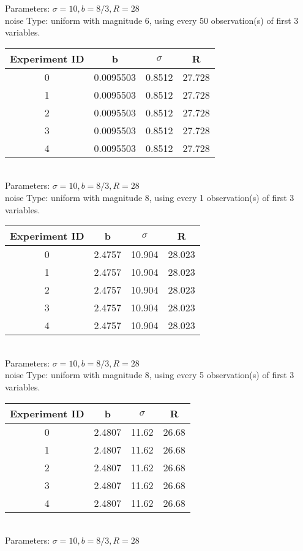 \begin{multicols}{3}
Parameters: $\sigma=10, b=8/3, R=28$\\
noise Type: uniform with magnitude 6, using every 50 observation(s) of first 3 variables.\\
\begin{tabular}{cccc}
\hline Experiment ID & b & $\sigma$ & R \\ \hline 
0 & 0.0095503 & 0.8512 & 27.728\\ \hline 
 1 & 0.0095503 & 0.8512 & 27.728\\ \hline 
 2 & 0.0095503 & 0.8512 & 27.728\\ \hline 
 3 & 0.0095503 & 0.8512 & 27.728\\ \hline 
 4 & 0.0095503 & 0.8512 & 27.728\\ \hline 
 \end{tabular}\\
Parameters: $\sigma=10, b=8/3, R=28$\\
noise Type: uniform with magnitude 8, using every 1 observation(s) of first 3 variables.\\
\begin{tabular}{cccc}
\hline Experiment ID & b & $\sigma$ & R \\ \hline 
0 & 2.4757 & 10.904 & 28.023\\ \hline 
 1 & 2.4757 & 10.904 & 28.023\\ \hline 
 2 & 2.4757 & 10.904 & 28.023\\ \hline 
 3 & 2.4757 & 10.904 & 28.023\\ \hline 
 4 & 2.4757 & 10.904 & 28.023\\ \hline 
 \end{tabular}\\
Parameters: $\sigma=10, b=8/3, R=28$\\
noise Type: uniform with magnitude 8, using every 5 observation(s) of first 3 variables.\\
\begin{tabular}{cccc}
\hline Experiment ID & b & $\sigma$ & R \\ \hline 
0 & 2.4807 & 11.62 & 26.68\\ \hline 
 1 & 2.4807 & 11.62 & 26.68\\ \hline 
 2 & 2.4807 & 11.62 & 26.68\\ \hline 
 3 & 2.4807 & 11.62 & 26.68\\ \hline 
 4 & 2.4807 & 11.62 & 26.68\\ \hline 
 \end{tabular}\\
Parameters: $\sigma=10, b=8/3, R=28$\\

\end{multicols}
